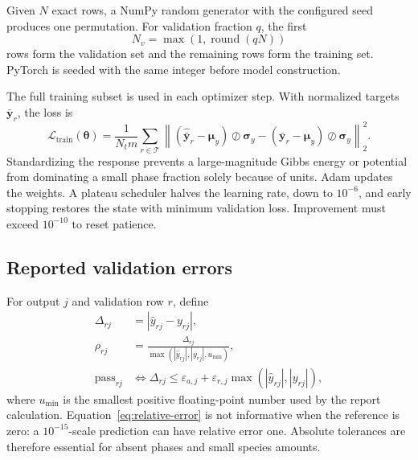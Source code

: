 \documentclass[11pt]{article}
\newcommand{\norm}[1]{\left\lVert #1\right\rVert_2}
\newcommand{\abs}[1]{\left\lvert #1\right\rvert}
\begin{document}
Given \(N\) exact rows, a NumPy random generator with the configured seed produces one permutation.
For validation fraction \(q\), the first
\begin{equation}
  N_v=\max\left(1,\operatorname{round}(qN)\right)
  \label{eq:validation-size}
\end{equation}
rows form the validation set and the remaining rows form the training set.  PyTorch is seeded with
the same integer before model construction.

The full training subset is used in each optimizer step.  With normalized targets
\(\bar{\boldsymbol{y}}_r\), the loss is
\begin{equation}
  \mathcal{L}_{\mathrm{train}}(\boldsymbol{\theta})
  =
  \frac{1}{N_t m}
  \sum_{r\in\mathcal{T}}
  \norm{
    \left(
      \widehat{\bar{\boldsymbol{y}}}_r-\boldsymbol{\mu}_y
    \right)\oslash\boldsymbol{\sigma}_y
    -
    \left(
      \bar{\boldsymbol{y}}_r-\boldsymbol{\mu}_y
    \right)\oslash\boldsymbol{\sigma}_y
  }^2.
  \label{eq:loss}
\end{equation}
Standardizing the response prevents a large-magnitude Gibbs energy or potential from dominating a
small phase fraction solely because of units.  Adam updates the weights.  A plateau scheduler
halves the learning rate, down to \(10^{-6}\), and early stopping restores the state with minimum
validation loss.  Improvement must exceed \(10^{-10}\) to reset patience.

\subsection{Reported validation errors}

For output \(j\) and validation row \(r\), define
\begin{align}
  \Delta_{rj}
    &=\abs{\widehat y_{rj}-y_{rj}},
    \label{eq:absolute-error}\\
  \rho_{rj}
    &=\frac{\Delta_{rj}}
      {\max\left(\abs{\widehat y_{rj}},\abs{y_{rj}},u_{\min}\right)},
    \label{eq:relative-error}\\
  \mathrm{pass}_{rj}
    &\Longleftrightarrow
    \Delta_{rj}
    \leq\varepsilon_{a,j}
    +\varepsilon_{r,j}
      \max\left(\abs{\widehat y_{rj}},\abs{y_{rj}}\right),
    \label{eq:validation-test}
\end{align}
where \(u_{\min}\) is the smallest positive floating-point number used by the report calculation.
Equation~\eqref{eq:relative-error} is not informative when the reference is zero: a
\(10^{-15}\)-scale prediction can have relative error one.  Absolute tolerances are therefore
essential for absent phases and small species amounts.
\end{document}
